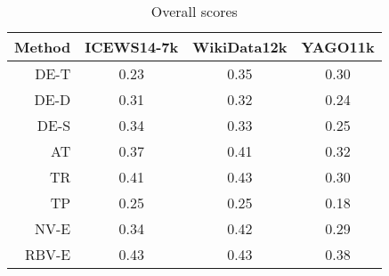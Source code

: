 \begin{table}[htb]
\centering
\begin{minipage}{\columnwidthcaption}
\centering
\caption{Overall scores}
\vspace{-3mm}

\begin{tabular}{r|ccc} \hline
Method & \mbox{ICEWS14-7k} & WikiData12k & YAGO11k \\ \hline
DE-T & 0.23 & 0.35 & 0.30 \\
DE-D & 0.31 & 0.32 & 0.24 \\
DE-S & 0.34 & 0.33 & 0.25 \\
AT & 0.37 & 0.41 & 0.32 \\
TR & 0.41 & 0.43 & 0.30 \\
TP & 0.25 & 0.25 & 0.18 \\
NV-E & 0.34 & 0.42 & 0.29 \\
RBV-E & 0.43 & 0.43 & 0.38 \\
\hline
\end{tabular}

\label{tab:overall_scores}
\end{minipage}
\end{table}

